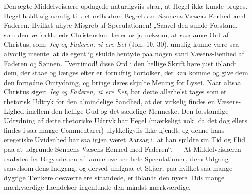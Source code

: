 \documentclass[12pt,a4paper]{book}
\begin{document}
Den ægte Middelveislære opdagede naturligviis strar, at Hegel ikke kunde bruges. Hegel
holdt sig nemlig til det orthodore Begreb om Sønnens Væsens-Eenhed med Faderen. Hvilket
uhyre Misgreb af Speculationen! „Saavel den sunde Forstand, som den velforklarede
Christendom lærer os jo noksom, at saadanne Ord af Christus, som: \emph{Jeg og Faderen,
vi ere Eet} (Joh. 10, 30), umulig kunne være saa alvorlig meente, at de egentlig skulde
hentyde paa nogen sand Væsens-Eenhed af Faderen og Sønnen. Tvertimod! disse Ord i den
hellige Skrift høre just iblandt dem, der staae og længes efter en fornuftig Fortolker,
der kan komme og give dem den fornødne Omtydning, og bringe deres skjulte Mening for
Lyset. Naar altsaa Christus siger: \emph{Jeg og Faderen, vi ere Eet}, bør dette
allerhelst tages som et rhetorisk Udtryk for den almindelige Sandhed, at der virkelig
findes en Væsens-Lighed imellem den hellige Gud og det sædelige Menneske. Den
forstandige Udtydning af dette rhetoriske Udtryk har Hegel (mærkeligt nok, da det dog
ellers findes i saa mange Commentarer) ulykkeligviis ikke kjendt; og denne hans
eregetiske Uvidenhed har saa igjen været Aarsag
i, at han spildte sin Tid og Flid paa at udgrunde Sønnens Væsens-Eenhed med
Faderen“. --- At Middelveislæren saaledes fra Begyndelsen af kunde oversee hele
Speculationen, dens Udgang saavelsom dens Indgang, og derved undgaae et Skjær, paa
hvilket saa mange dygtige Tænkere desværre ere strandede, er iblandt den nyere Tids
mange mærkværdige Hændelser ingenlunde den mindst mærkværdige.
\end{document}
